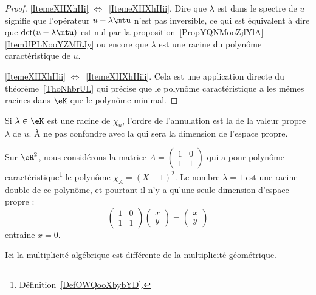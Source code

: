 \begin{proof}
    \ref{ItemeXHXhHi} \( \Leftrightarrow\)~\ref{ItemeXHXhHii}. Dire que \( \lambda\) est dans le spectre de \( u\) signifie que l'opérateur \( u-\lambda\mtu\) n'est pas inversible, ce qui est équivalent à dire que \( \det(u-\lambda\mtu)\) est nul par la proposition~\ref{PropYQNMooZjlYlA}\ref{ItemUPLNooYZMRJy} ou encore que \( \lambda\) est une racine du polynôme caractéristique de \( u\).

    \ref{ItemeXHXhHii} \( \Leftrightarrow\)~\ref{ItemeXHXhHiii}. Cela est une application directe du théorème~\ref{ThoNhbrUL} qui précise que le polynôme caractéristique a les mêmes racines dans \(\eK\) que le polynôme minimal.
\end{proof}

\begin{definition}
    Si \( \lambda\in\eK\) est une racine de \( \chi_u\), l'ordre de l'annulation est la  de la valeur propre \( \lambda\) de \( u\). À ne pas confondre avec la  qui sera la dimension de l'espace propre.
\end{definition}

\begin{example} \label{ExICOJcFp}
    Sur \( \eR^2\), nous considérons la matrice \( A=\begin{pmatrix}
        1    &   0    \\
        1    &   1
    \end{pmatrix}\) qui a pour polynôme caractéristique\footnote{Définition~\ref{DefOWQooXbybYD}.} le polynôme \( \chi_A=(X-1)^2\). Le nombre \( \lambda=1\) est une racine double de ce polynôme, et pourtant il n'y a qu'une seule dimension d'espace propre :
    \begin{equation}
        \begin{pmatrix}
            1    &   0    \\
            1    &   1
        \end{pmatrix}\begin{pmatrix}
            x    \\
            y
        \end{pmatrix}=\begin{pmatrix}
            x    \\
            y
        \end{pmatrix}
    \end{equation}
    entraine \( x=0\).

    Ici la multiplicité algébrique est différente de la multiplicité géométrique.
\end{example}

